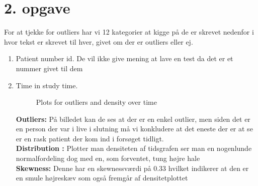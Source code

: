 \chapter{2. opgave}
For at tjekke for outliers har vi 12 kategorier at kigge på de er skrevet nedenfor i hvor tekst er skrevet til hver, givet om der er outliers eller ej.
\begin{enumerate}
\item Patient number id. \newline
De vil ikke give mening at lave en test da det er et nummer givet til dem 
\item  Time in study time.
\newline

\begin{figure}[h]
  \centering
  \hfill
  \hfill
  \caption{Plots for outliers and density over time}
\end{figure}

\textbf{Outliers: }På billedet kan de ses at der er en enkel outlier, men siden det er en person der var i live i slutning må vi konkludere at det eneste der er at se er en rask patient der kom ind i forsøget tidligt.\\
\textbf{Distribution :} Plotter man densiteten af tidsgrafen ser man en nogenlunde normalfordeling dog med en, som forventet, tung højre hale\\
\textbf{Skewness:} Denne har en skewnessværdi på 0.33 hvilket indikerer at den er en smule højreskæv som også fremgår af densitetplottet



\end{enumerate}
